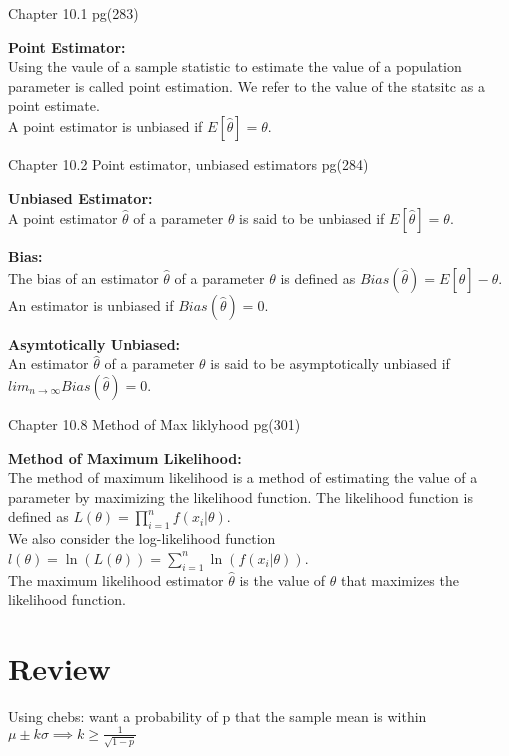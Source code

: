 \documentclass[answers,12pt,addpoints]{exam}
\begin{document}
Chapter 10.1 pg(283)\\
\begin{definition}
    \textbf{Point Estimator:}\\
    Using the vaule of a sample statistic to estimate the value of a population parameter is called point estimation. We refer to the value of the statsitc as a point estimate.\\
    A point estimator is unbiased if $E[\hat{\theta}] = \theta$.
\end{definition}
Chapter 10.2 Point estimator, unbiased estimators pg(284)\\
\begin{definition}
    \textbf{Unbiased Estimator:}\\
    A point estimator $\hat{\theta}$ of a parameter $\theta$ is said to be unbiased if $E[\hat{\theta}] = \theta$.
\end{definition}
\begin{definition}
    \textbf{Bias:}\\
    The bias of an estimator $\hat{\theta}$ of a parameter $\theta$ is defined as $Bias(\hat{\theta}) = E[\hat{\theta}] - \theta$. An estimator is unbiased if $Bias(\hat{\theta}) = 0$.
\end{definition}
\begin{definition}
    \textbf{Asymtotically Unbiased:}\\
    An estimator $\hat{\theta}$ of a parameter $\theta$ is said to be asymptotically unbiased if $lim_{n \to \infty} Bias(\hat{\theta}) = 0$.
\end{definition}
Chapter 10.8 Method of Max liklyhood pg(301)\\
\begin{definition}
    \textbf{Method of Maximum Likelihood:}\\
    The method of maximum likelihood is a method of estimating the value of a parameter by maximizing the likelihood function. The likelihood function is defined as $L(\theta) = \prod_{i=1}^{n}f(x_i|\theta)$.\\
    We also consider the log-likelihood function $l(\theta) = \ln(L(\theta)) = \sum_{i=1}^{n}\ln(f(x_i|\theta))$.\\
    The maximum likelihood estimator $\hat{\theta}$ is the value of $\theta$ that maximizes the likelihood function.\\
\end{definition}


\section{Review}
Using chebs: want a probability of p that the sample mean is within $\mu \pm k \sigma \implies k \geq \frac{1}{\sqrt{1-p}}$ \\
\end{document}

